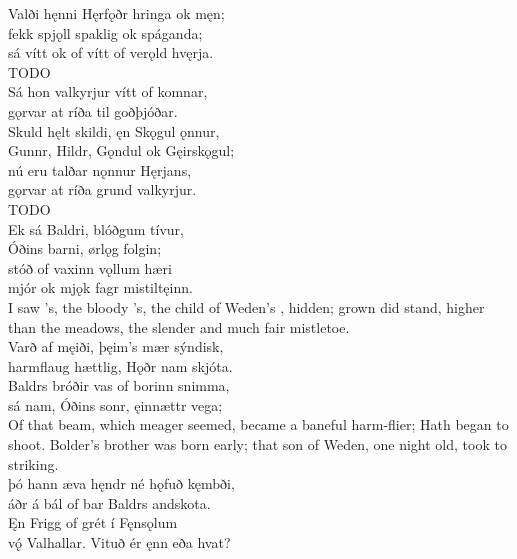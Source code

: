\bva Valði hęnni Hęrfǫðr \hld hringa ok męn; \\%
fekk spjǫll spaklig \hld ok spáganda; \\%
sá vítt ok of vítt \hld of verǫld hvęrja.\\%

\bvb TODO\\%

\bva Sá hon valkyrjur \hld vítt of komnar, \\%
gǫrvar at ríða \hld til goðþjóðar. \\%
Skuld hęlt skildi, \hld ęn Skǫgul ǫnnur, \\%
Gunnr, Hildr, Gǫndul \hld ok Gęirskǫgul; \\%
nú eru talðar \hld nǫnnur Hęrjans, \\%
gǫrvar at ríða \hld grund valkyrjur.\\%

\bvb TODO\\%

\bva Ek sá Baldri, \hld blóðgum tívur, \\%
Óðins barni, \hld ørlǫg folgin; \\%
stóð of vaxinn \hld vǫllum hæri \\%
mjór ok mjǫk fagr \hld mistiltęinn.\\%

\bvb I saw ’s, the bloody ’s, the child of Weden’s , hidden; grown did stand, higher than the meadows, the slender and much fair mistletoe.\\%

\bva Varð af męiði, \hld þęim’s mær sýndisk, \\%
harmflaug hættlig, \hld Hǫðr nam skjóta. \\%
Baldrs bróðir vas \hld of borinn snimma, \\%
sá nam, Óðins sonr, \hld ęinnættr vega;\\%

\bvb Of that beam, which meager seemed, became a baneful harm-flier; Hath began to shoot. Bolder’s brother was born early; that son of Weden, one night old, took to striking.\\%

\bva þó hann æva hęndr \hld né hǫfuð kęmbði, \\%
áðr á bál of bar \hld Baldrs andskota. \\%
Ęn Frigg of grét \hld í Fęnsǫlum \\%
vǫ́ Valhallar. \hld Vituð ér ęnn eða hvat?\\%

